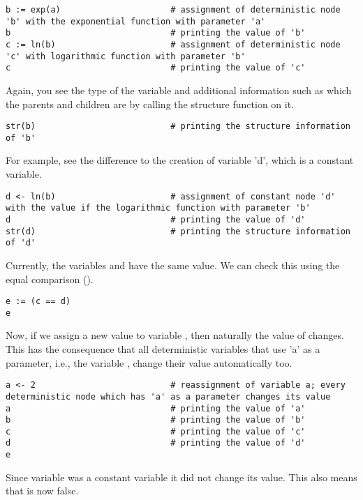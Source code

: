 {\tt \begin{snugshade*}
\begin{lstlisting}    
b := exp(a)                      # assignment of deterministic node 'b' with the exponential function with parameter 'a'
b                                # printing the value of 'b'
c := ln(b)                       # assignment of deterministic node 'c' with logarithmic function with parameter 'b'
c                                # printing the value of 'c'
\end{lstlisting}
\end{snugshade*}}
Again, you see the type of the variable and additional information such as which the parents and children are by calling the structure function on it.
{\tt \begin{snugshade*}
\begin{lstlisting}    
str(b)                           # printing the structure information of 'b'
\end{lstlisting}
\end{snugshade*}}
For example, see the difference to the creation of variable 'd', which is a constant variable.
{\tt \begin{snugshade*}
\begin{lstlisting}    
d <- ln(b)                       # assignment of constant node 'd' with the value if the logarithmic function with parameter 'b'
d                                # printing the value of 'd'
str(d)                           # printing the structure information of 'd'
\end{lstlisting}
\end{snugshade*}}
Currently, the variables  and  have the same value. 
We can check this using the equal comparison (\cl{==}).
{\tt \begin{snugshade*}
\begin{lstlisting}    
e := (c == d)			
e
\end{lstlisting}
\end{snugshade*}}
Now, if we assign a new value to variable , then naturally the value of  changes. 
This has the consequence that all deterministic variables that use 'a' as a parameter, i.e., the variable , change their value automatically too.
{\tt \begin{snugshade*}
\begin{lstlisting}    
a <- 2                           # reassignment of variable a; every deterministic node which has 'a' as a parameter changes its value
a                                # printing the value of 'a'
b                                # printing the value of 'b'
c                                # printing the value of 'c'
d                                # printing the value of 'd'
e
\end{lstlisting}
\end{snugshade*}}
Since variable  was a constant variable it did not change its value. 
This also means that  is now false.

